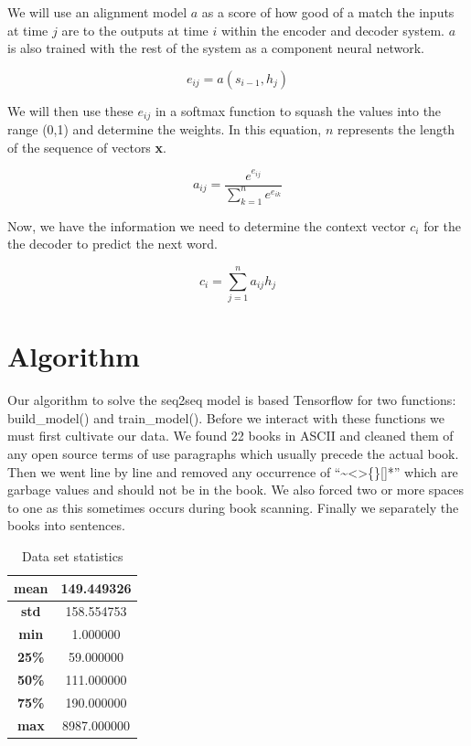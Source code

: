 \documentclass[11pt,a4paper]{scrartcl}
\theoremstyle{definition}
\begin{document}
We will use an alignment model $a$ as a score of how good of a match the inputs at time $j$ are to the outputs at time $i$ within the encoder and decoder system. $a$ is also trained with the rest of the system as a component neural network.

\[e_{ij} = a(s_{i-1},h_j)\]

We will then use these $e_{ij}$ in a softmax function to squash the values into the range (0,1) and determine the weights. In this equation, $n$ represents the length of the sequence of vectors \textbf{x}.

\[a_{ij} = \frac{e^{e_{ij}}}{\sum_{k=1}^{n}e^{e_{ik}}}\]

Now, we have the information we need to determine the context vector $c_i$ for the the decoder to predict the next word.

\[c_i = \sum_{j=1}^na_{ij}h_j\]

\section{Algorithm}
Our algorithm to solve the seq2seq model is based Tensorflow for two functions: build\_model() and train\_model(). Before we interact with these functions we must first cultivate our data. We found 22 books in ASCII and cleaned them of any open source terms of use paragraphs which usually precede the actual book. Then we went line by line and removed any occurrence of “\textasciitilde<>\{\}[]*” which are garbage values and should not be in the book. We also forced two or more spaces to one as this sometimes occurs during book scanning. Finally we separately the books into sentences.\newline

\FloatBarrier
\begin{table}
\begin{center}
\begin{tabular}{ |c|c|} 
\hline
\textbf{mean} & 149.449326 \\
\hline
\textbf{std} & 158.554753 \\
\hline
\textbf{min} & 1.000000 \\
\hline
\textbf{25\%} & 59.000000 \\
\hline
\textbf{50\%} & 111.000000 \\
\hline
\textbf{75\%} & 190.000000 \\
\hline
\textbf{max} & 8987.000000 \\
\hline
\end{tabular}
\caption{Data set statistics} 
\label{datastats}
\end{center}
\end{table}
\end{document}
